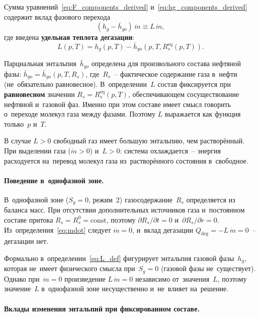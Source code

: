\documentclass[12pt,a4paper]{article}
\newcommand{\mdot}{\dot{m}}
\begin{document}
Сумма уравнений~\eqref{eq:F_components_derived} и~\eqref{eq:hg_components_derived}
содержит вклад фазового перехода
\begin{equation}\label{eq:phase_change_heat}
  (h_g - \bar{h}_{go})\,\mdot \equiv L\,\mdot,
\end{equation}
где введена \textbf{удельная теплота дегазации}:
\begin{equation}\label{eq:L_def}
  \boxed{
    L(p,T) = h_g(p,T) - \bar{h}_{go}(p, T, R_s^{\text{eq}}(p,T)).
  }
\end{equation}

Парциальная энтальпия~$\bar{h}_{go}$ определена для произвольного
состава нефтяной фазы: $\bar{h}_{go} = \bar{h}_{go}(p, T, R_s)$,
где~$R_s$~-- фактическое содержание газа в~нефти (не~обязательно
равновесное). В~определении~$L$ состав фиксируется при
\textbf{равновесном} значении $R_s = R_s^{\text{eq}}(p,T)$,
обеспечивающем сосуществование нефтяной и~газовой фаз.
Именно при этом составе имеет смысл говорить о~переходе молекул
газа между фазами. Поэтому $L$ выражается как функция только~$p$
и~$T$.

В случае $L > 0$ свободный газ имеет большую энтальпию, чем растворённый.
При выделении газа ($\mdot > 0$) и~$L > 0$: система охлаждается~--
энергия расходуется на~перевод молекул газа из~растворённого состояния
в~свободное.

\paragraph{Поведение в~однофазной зоне.}
В~однофазной зоне ($S_g = 0$, режим~2) газосодержание~$R_s$
определяется из баланса масс. При отсутствии дополнительных
источников газа и~постоянном составе притока $R_s = R_s^0 =
\mathrm{const}$, поэтому $\partial R_s/\partial t = 0$
и~$\partial R_s/\partial r = 0$. Из~определения~\eqref{eq:mdot}
следует $\mdot = 0$, и~вклад дегазации $Q_{\mathrm{deg}}
= -L\,\mdot = 0$~-- дегазации нет.

Формально в~определении~\eqref{eq:L_def} фигурирует энтальпия
газовой фазы~$h_g$, которая не~имеет физического смысла при~$S_g=0$
(газовой фазы не~существует). Однако при~$\mdot = 0$ произведение
$L\,\mdot = 0$ независимо от~значения~$L$, поэтому значение~$L$
в~однофазной зоне несущественно и~не~влияет на~решение.

\paragraph{Вклады изменения энтальпий при фиксированном составе.}
\end{document}
